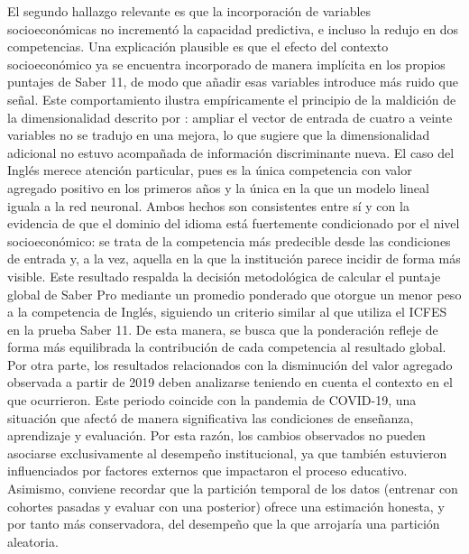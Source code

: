El segundo hallazgo relevante es que la incorporación de variables socioeconómicas no incrementó la capacidad predictiva, e incluso la redujo en dos competencias. Una explicación plausible es que el efecto del contexto socioeconómico ya se encuentra incorporado de manera implícita en los propios puntajes de Saber 11, de modo que añadir esas variables introduce más ruido que señal. Este comportamiento ilustra empíricamente el principio de la maldición de la dimensionalidad descrito por \cite{verleysen2005curse}: ampliar el vector de entrada de cuatro a veinte variables no se tradujo en una mejora, lo que sugiere que la dimensionalidad adicional no estuvo acompañada de información discriminante nueva.
El caso del Inglés merece atención particular, pues es la única competencia con valor agregado positivo en los primeros años y la única en la que un modelo lineal iguala a la red neuronal. Ambos hechos son consistentes entre sí y con la evidencia de que el dominio del idioma está fuertemente condicionado por el nivel socioeconómico: se trata de la competencia más predecible desde las condiciones de entrada y, a la vez, aquella en la que la institución parece incidir de forma más visible. Este resultado respalda la decisión metodológica de calcular el puntaje global de Saber Pro mediante un promedio ponderado que otorgue un menor peso a la competencia de Inglés, siguiendo un criterio similar al que utiliza el ICFES en la prueba Saber 11. 
De esta manera, se busca que la ponderación refleje de forma más equilibrada la contribución de cada competencia al resultado global. Por otra parte, los resultados relacionados con la disminución del valor agregado observada a partir de 2019 deben analizarse teniendo en cuenta el contexto en el que ocurrieron. Este periodo coincide con la pandemia de COVID-19, una situación que afectó de manera significativa las condiciones de enseñanza, aprendizaje y evaluación. Por esta razón, los cambios observados no pueden asociarse exclusivamente al desempeño institucional, ya que también estuvieron influenciados por factores externos que impactaron el proceso educativo. Asimismo, conviene recordar que la partición temporal de los datos (entrenar con cohortes pasadas y evaluar con una posterior) ofrece una estimación honesta, y por tanto más conservadora, del desempeño que la que arrojaría una partición aleatoria.